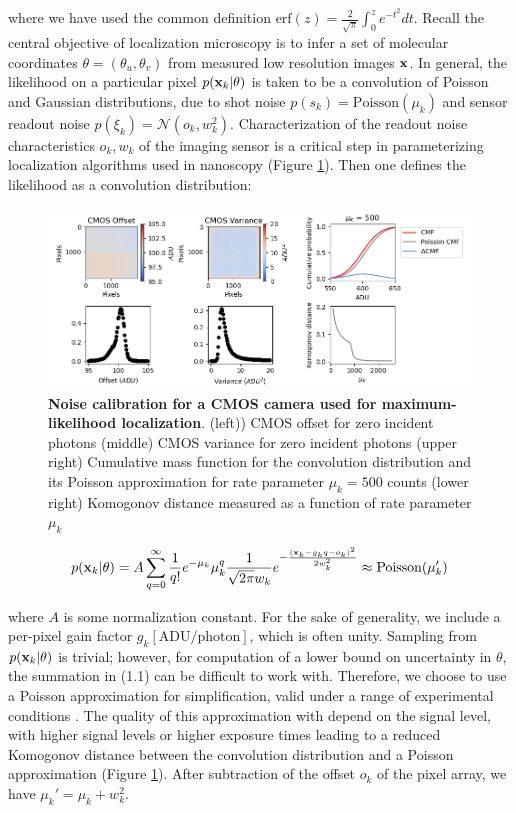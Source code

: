where we have used the common definition $\mathrm{erf}(z) = \frac{2}{\sqrt{\pi}}\int_{0}^{z}e^{-t^{2}}dt$. Recall the central objective of localization microscopy is to infer a set of molecular coordinates $\theta=(\theta_{u},\theta_{v})$ from measured low resolution images $\bold{x}$. In general, the likelihood on a particular pixel $p(\bold{x}_k\lvert\theta)$ is taken to be a convolution of Poisson and Gaussian distributions, due to shot noise $p(s_{k}) = \mathrm{Poisson}(\mu_{k})$ and sensor readout noise $p(\xi_{k}) = \mathcal{N}(o_{k},w_{k}^{2})$. Characterization of the readout noise characteristics $o_{k},w_{k}$ of the imaging sensor is a critical step in parameterizing localization algorithms used in nanoscopy (Figure \ref{fig:fig2}). Then one defines the likelihood as a convolution distribution:

\begin{figure}[t]
\begin{center}
\includegraphics[width=16cm]{media/Noise.png}
\end{center}
\caption{\textbf{Noise calibration for a CMOS camera used for maximum-likelihood localization}. (left)) CMOS offset for zero incident photons (middle) CMOS variance for zero incident photons (upper right) Cumulative mass function for the convolution distribution and its Poisson approximation for rate parameter $\mu_{k} = 500$ counts (lower right) Komogonov distance measured as a function of rate parameter $\mu_{k}$}
\label{fig:fig2}
\end{figure}

\begin{equation}
p(\bold{x}_{k}\lvert\theta) = A\sum_{q=0}^{\infty} \frac{1}{q!}e^{-\mu_{k}}\mu_{k}^{q}\frac{1}{\sqrt{2\pi}w_{k}}e^{-\frac{(\bold{x}_{k}-g_{k}q-o_{k})^2}{2 w_{k}^{2}}} \approx \mathrm{Poisson}(\mu_{k}')
\end{equation}

where $A$ is some normalization constant. For the sake of generality, we include a per-pixel gain factor $g_{k} [\mathrm{ADU}/\mathrm{photon}]$, which is often unity. Sampling from $p(\bold{x}_{k}\lvert\theta)$ is trivial; however, for computation of a lower bound on uncertainty in $\theta$, the summation in (1.1) can be difficult to work with. Therefore, we choose to use a Poisson approximation for simplification, valid under a range of experimental conditions \parencite{Huang2013}. The quality of this approximation with depend on the signal level, with higher signal levels or higher exposure times leading to a reduced Komogonov distance between the convolution distribution and a Poisson approximation (Figure \ref{fig:fig2}). After subtraction of the offset $o_{k}$ of the pixel array, we have $\mu_{k}' = \mu_{k} + w_{k}^{2}$.

